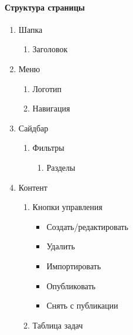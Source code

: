 \paragraph{Структура страницы}
\begin{enumerate}
	\item Шапка
	\begin{enumerate}
		\item Заголовок
	\end{enumerate}

	\item Меню
	\begin{enumerate}
		\item Логотип
		\item Навигация
	\end{enumerate}

	\item Сайдбар
	\begin{enumerate}
		\item Фильтры
		\begin{enumerate}
			\item Разделы
		\end{enumerate}
	\end{enumerate}

	\item Контент
	\begin{enumerate}
		\item Кнопки управления
		\begin{itemize}
			\item Создать/редактировать
			\item Удалить
			\item Импортировать
			\item Опубликовать
			\item Снять с публикации
		\end{itemize}
		\item Таблица задач
	\end{enumerate}
\end{enumerate}

